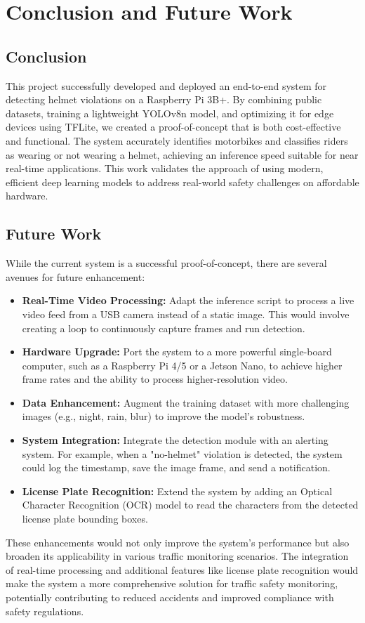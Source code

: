 \chapter{Conclusion and Future Work}
\section{Conclusion}
This project successfully developed and deployed an end-to-end system for detecting helmet violations on a Raspberry Pi 3B+. By combining public datasets, training a lightweight YOLOv8n model, and optimizing it for edge devices using TFLite, we created a proof-of-concept that is both cost-effective and functional. The system accurately identifies motorbikes and classifies riders as wearing or not wearing a helmet, achieving an inference speed suitable for near real-time applications. This work validates the approach of using modern, efficient deep learning models to address real-world safety challenges on affordable hardware.

\section{Future Work}
While the current system is a successful proof-of-concept, there are several avenues for future enhancement:
\begin{itemize}
    \item \textbf{Real-Time Video Processing:} Adapt the inference script to process a live video feed from a USB camera instead of a static image. This would involve creating a loop to continuously capture frames and run detection.
    \item \textbf{Hardware Upgrade:} Port the system to a more powerful single-board computer, such as a Raspberry Pi 4/5 or a Jetson Nano, to achieve higher frame rates and the ability to process higher-resolution video.
    \item \textbf{Data Enhancement:} Augment the training dataset with more challenging images (e.g., night, rain, blur) to improve the model's robustness.
    \item \textbf{System Integration:} Integrate the detection module with an alerting system. For example, when a "no-helmet" violation is detected, the system could log the timestamp, save the image frame, and send a notification.
    \item \textbf{License Plate Recognition:} Extend the system by adding an Optical Character Recognition (OCR) model to read the characters from the detected license plate bounding boxes.
\end{itemize}

These enhancements would not only improve the system's performance but also broaden its applicability in various traffic monitoring scenarios. The integration of real-time processing and additional features like license plate recognition would make the system a more comprehensive solution for traffic safety monitoring, potentially contributing to reduced accidents and improved compliance with safety regulations.
